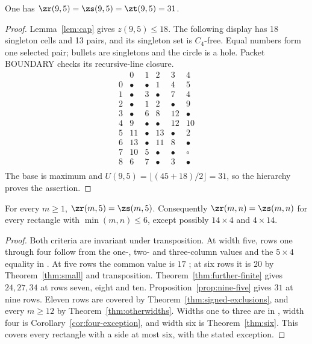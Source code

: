 \begin{proposition}\label{prop:nine-five}
One has $\zr(9,5)=\zs(9,5)=\zt(9,5)=31$.
\end{proposition}
\begin{proof}
Lemma~\ref{lem:cap} gives $z(9,5)\le18$. The following display has
18 singleton cells and 13 pairs, and its singleton set is $C_4$-free.
Equal numbers form one selected pair; bullets are singletons and the
circle is a hole. Packet BOUNDARY checks its recursive-line closure.
\[
\begin{array}{c|ccccc}
 &0&1&2&3&4\\\hline
0 & \bullet & \bullet & 1 & 4 & 5\\
1 & \bullet & 3 & \bullet & 7 & 4\\
2 & \bullet & 1 & 2 & \bullet & 9\\
3 & \bullet & 6 & 8 & 12 & \bullet\\
4 & 9 & \bullet & \bullet & 12 & 10\\
5 & 11 & \bullet & 13 & \bullet & 2\\
6 & 13 & \bullet & 11 & 8 & \bullet\\
7 & 10 & 5 & \bullet & \bullet & \circ\\
8 & 6 & 7 & \bullet & 3 & \bullet\\
\end{array}
\]
The base is maximum and $U(9,5)=\lfloor(45+18)/2\rfloor=31$, so the
hierarchy proves the assertion.
\end{proof}

\begin{corollary}\label{cor:five-and-six}
For every $m\ge1$, $\zr(m,5)=\zs(m,5)$. Consequently
$\zr(m,n)=\zs(m,n)$ for every rectangle with $\min(m,n)\le6$, except
possibly $14\times4$ and $4\times14$.
\end{corollary}

\begin{proof}
Both criteria are invariant under transposition. At width five, rows one
through four follow from the one-, two- and three-column values and the
$5\times4$ equality in \cite{LQ,XY}. At five rows the common value is $17$
\cite{LQ,XY}; at six rows it is $20$ by Theorem~\ref{thm:small} and
transposition. Theorem~\ref{thm:further-finite} gives $24,27,34$ at rows
seven, eight and ten. Proposition~\ref{prop:nine-five} gives $31$ at nine
rows. Eleven rows are covered by Theorem~\ref{thm:signed-exclusions},
and every $m\ge12$ by Theorem~\ref{thm:otherwidths}.
Widths one to three are in \cite{LQ}, width four is
Corollary~\ref{cor:four-exception}, and width six is Theorem~\ref{thm:six}.
This covers every rectangle with a side at most six, with the stated
exception.
\end{proof}

